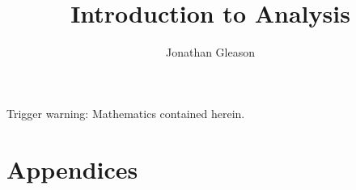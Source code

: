 \documentclass[print,title,oneside]{text}
\title{Introduction to Analysis}
\author{Jonathan Gleason}
\begin{document}

Trigger warning:  Mathematics contained herein.



\pagestyle{empty} %

\tableofcontents %

\newpage



\cleardoublepage %

\pagestyle{fancy} %














\appendix %
\part*{Appendices} %



\stopcontents %



\printbibliography

\printindex
\printindex[notation]

\end{document}
